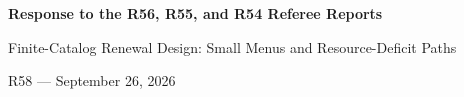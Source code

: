 \documentclass[11pt,letterpaper]{article}
\theoremstyle{definition}\newtheorem{remark}[theorem]{Remark}
\begin{document}
\begin{center}{\Large\bfseries Response to the R56, R55, and R54 Referee Reports}\par Finite-Catalog Renewal Design: Small Menus and Resource-Deficit Paths\par R58 --- September 26, 2026\end{center}

\end{document}
